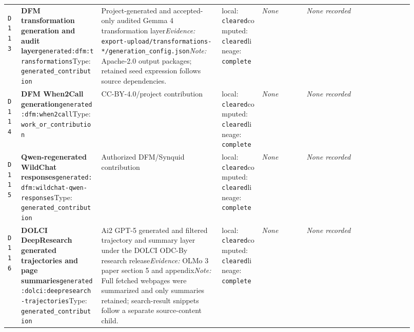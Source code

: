 \documentclass[9pt,a4paper]{article}
\newcommand{\depid}[1]{\hypertarget{dep:#1}{\texttt{#1}}}
\begin{document}
\begin{landscape}
\begin{longtable}{@{}L{0.035\linewidth}L{0.185\linewidth}L{0.27\linewidth}L{0.09\linewidth}L{0.10\linewidth}L{0.24\linewidth}@{}}
\depid{D113} & \textbf{DFM transformation generation and audit layer}\newline \nolinkurl{generated:dfm:transformations}\newline Type: \texttt{generated\_contribution} & Project-generated and accepted-only audited Gemma 4 transformation layer\newline \textit{Evidence:} \nolinkurl{export-upload/transformations-*/generation_config.json}\newline \textit{Note:} Apache-2.0 output packages; retained seed expression follows source dependencies. & local: \texttt{cleared}\newline computed: \texttt{cleared}\newline lineage: \texttt{complete} & \textit{None} & \textit{None recorded} \\
\depid{D114} & \textbf{DFM When2Call generation}\newline \nolinkurl{generated:dfm:when2call}\newline Type: \texttt{work\_or\_contribution} & CC-BY-4.0/project contribution & local: \texttt{cleared}\newline computed: \texttt{cleared}\newline lineage: \texttt{complete} & \textit{None} & \textit{None recorded} \\
\depid{D115} & \textbf{Qwen-regenerated WildChat responses}\newline \nolinkurl{generated:dfm:wildchat-qwen-responses}\newline Type: \texttt{generated\_contribution} & Authorized DFM/Synquid contribution & local: \texttt{cleared}\newline computed: \texttt{cleared}\newline lineage: \texttt{complete} & \textit{None} & \textit{None recorded} \\
\depid{D116} & \textbf{DOLCI DeepResearch generated trajectories and page summaries}\newline \nolinkurl{generated:dolci:deepresearch-trajectories}\newline Type: \texttt{generated\_contribution} & Ai2 GPT-5 generated and filtered trajectory and summary layer under the DOLCI ODC-By research release\newline \textit{Evidence:} OLMo 3 paper section 5 and appendix\newline \textit{Note:} Full fetched webpages were summarized and only summaries retained; search-result snippets follow a separate source-content child. & local: \texttt{cleared}\newline computed: \texttt{cleared}\newline lineage: \texttt{complete} & \textit{None} & \textit{None recorded} \\

\end{longtable}
\end{landscape}
\end{document}
